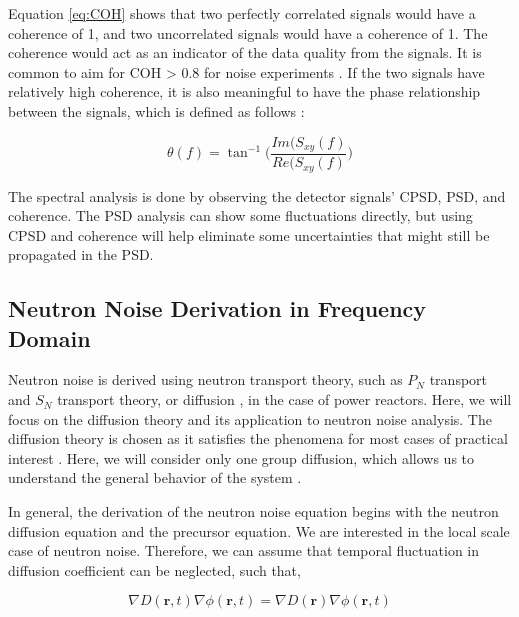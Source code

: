Equation \ref{eq:COH} shows that two perfectly correlated signals would have a coherence of 1, and two uncorrelated signals would have a coherence of 1. The coherence would act as an indicator of the data quality from the signals. It is common to aim for COH > 0.8 for noise experiments \cite{ambrozicNoiseAnalysisTechniques2020}. If the two signals have relatively high coherence, it is also meaningful to have the phase relationship between the signals, which is defined as follows \cite{fryAnalysisNeutrondensityOscillations1975}:

\begin{equation}
    \theta (f) = \tan^{-1} \biggr( \frac{Im(S_{xy} (f)}{Re(S_{xy} (f)} \biggr)
\end{equation}

The spectral analysis is done by observing the detector signals’ CPSD, PSD, and coherence. The PSD analysis can show some fluctuations directly, but using CPSD and coherence will help eliminate some uncertainties that might still be propagated in the PSD.

\subsection{Neutron Noise Derivation in Frequency Domain}

Neutron noise is derived using neutron transport theory, such as $P_N$ transport and $S_N$ transport theory, or diffusion \cite{bahramiNewApproachCalculation2020, demaziereDevelopment2D2group2004}, in the case of power reactors. Here, we will focus on the diffusion theory and its application to neutron noise analysis. The diffusion theory is chosen as it satisfies the phenomena for most cases of practical interest \cite{pazsitNoiseTechniquesNuclear2010}. Here, we will consider only one group diffusion, which allows us to understand the general behavior of the system \cite{pazsitNoiseTechniquesNuclear2010}. 

In general, the derivation of the neutron noise equation begins with the neutron diffusion equation and the precursor equation. We are interested in the local scale case of neutron noise. Therefore, we can assume that temporal fluctuation in diffusion coefficient can be neglected, such that,

\begin{equation}
        \nabla D(\textbf{r}, t) \nabla \phi(\textbf{r}, t) = \nabla D(\textbf{r}) \nabla \phi(\textbf{r}, t)
\end{equation}

